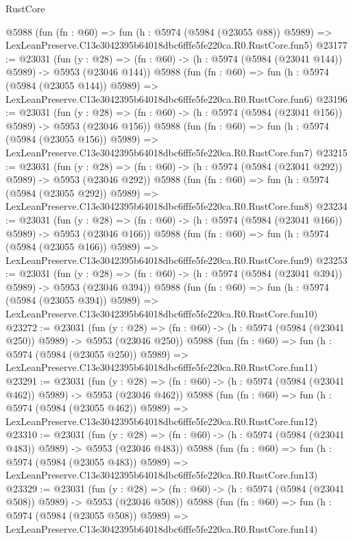 \begin{lexlean}{RustCore}
\begin{coremodule}
    @5988
    (fun (fn : @60) =>
    fun (h : @5974 (@5984 (@23055 @88)) @5989) =>
    LexLeanPreserve.C13e3042395b64018dbc6fffe5fe220ca.R0.RustCore.fun5)
@23177 := @23031
    (fun (y : @28) => (fn : @60) -> (h : @5974 (@5984 (@23041 @144)) @5989) -> @5953 (@23046 @144))
    @5988
    (fun (fn : @60) =>
    fun (h : @5974 (@5984 (@23055 @144)) @5989) =>
    LexLeanPreserve.C13e3042395b64018dbc6fffe5fe220ca.R0.RustCore.fun6)
@23196 := @23031
    (fun (y : @28) => (fn : @60) -> (h : @5974 (@5984 (@23041 @156)) @5989) -> @5953 (@23046 @156))
    @5988
    (fun (fn : @60) =>
    fun (h : @5974 (@5984 (@23055 @156)) @5989) =>
    LexLeanPreserve.C13e3042395b64018dbc6fffe5fe220ca.R0.RustCore.fun7)
@23215 := @23031
    (fun (y : @28) => (fn : @60) -> (h : @5974 (@5984 (@23041 @292)) @5989) -> @5953 (@23046 @292))
    @5988
    (fun (fn : @60) =>
    fun (h : @5974 (@5984 (@23055 @292)) @5989) =>
    LexLeanPreserve.C13e3042395b64018dbc6fffe5fe220ca.R0.RustCore.fun8)
@23234 := @23031
    (fun (y : @28) => (fn : @60) -> (h : @5974 (@5984 (@23041 @166)) @5989) -> @5953 (@23046 @166))
    @5988
    (fun (fn : @60) =>
    fun (h : @5974 (@5984 (@23055 @166)) @5989) =>
    LexLeanPreserve.C13e3042395b64018dbc6fffe5fe220ca.R0.RustCore.fun9)
@23253 := @23031
    (fun (y : @28) => (fn : @60) -> (h : @5974 (@5984 (@23041 @394)) @5989) -> @5953 (@23046 @394))
    @5988
    (fun (fn : @60) =>
    fun (h : @5974 (@5984 (@23055 @394)) @5989) =>
    LexLeanPreserve.C13e3042395b64018dbc6fffe5fe220ca.R0.RustCore.fun10)
@23272 := @23031
    (fun (y : @28) => (fn : @60) -> (h : @5974 (@5984 (@23041 @250)) @5989) -> @5953 (@23046 @250))
    @5988
    (fun (fn : @60) =>
    fun (h : @5974 (@5984 (@23055 @250)) @5989) =>
    LexLeanPreserve.C13e3042395b64018dbc6fffe5fe220ca.R0.RustCore.fun11)
@23291 := @23031
    (fun (y : @28) => (fn : @60) -> (h : @5974 (@5984 (@23041 @462)) @5989) -> @5953 (@23046 @462))
    @5988
    (fun (fn : @60) =>
    fun (h : @5974 (@5984 (@23055 @462)) @5989) =>
    LexLeanPreserve.C13e3042395b64018dbc6fffe5fe220ca.R0.RustCore.fun12)
@23310 := @23031
    (fun (y : @28) => (fn : @60) -> (h : @5974 (@5984 (@23041 @483)) @5989) -> @5953 (@23046 @483))
    @5988
    (fun (fn : @60) =>
    fun (h : @5974 (@5984 (@23055 @483)) @5989) =>
    LexLeanPreserve.C13e3042395b64018dbc6fffe5fe220ca.R0.RustCore.fun13)
@23329 := @23031
    (fun (y : @28) => (fn : @60) -> (h : @5974 (@5984 (@23041 @508)) @5989) -> @5953 (@23046 @508))
    @5988
    (fun (fn : @60) =>
    fun (h : @5974 (@5984 (@23055 @508)) @5989) =>
    LexLeanPreserve.C13e3042395b64018dbc6fffe5fe220ca.R0.RustCore.fun14)

\end{coremodule}
\end{lexlean}
